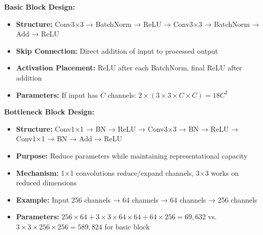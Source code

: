 \documentclass[12pt]{article}
\newcommand{\explanation}[1]{{\color{explanationcolor}#1}}
\begin{document}
\begin{enumerate}[(a)]
\begin{center}
    \end{center}
    
    \explanation{
    \textbf{Basic Block Design:}
    \begin{itemize}
        \item \textbf{Structure:} Conv3×3 → BatchNorm → ReLU → Conv3×3 → BatchNorm → Add → ReLU
        \item \textbf{Skip Connection:} Direct addition of input to processed output
        \item \textbf{Activation Placement:} ReLU after each BatchNorm, final ReLU after addition
        \item \textbf{Parameters:} If input has $C$ channels: $2 \times (3 \times 3 \times C \times C) = 18C^2$
    \end{itemize}
    
    \textbf{Bottleneck Block Design:}
    \begin{itemize}
        \item \textbf{Structure:} Conv1×1 → BN → ReLU → Conv3×3 → BN → ReLU → Conv1×1 → BN → Add → ReLU
        \item \textbf{Purpose:} Reduce parameters while maintaining representational capacity
        \item \textbf{Mechanism:} 1×1 convolutions reduce/expand channels, 3×3 works on reduced dimensions
        \item \textbf{Example:} Input 256 channels → 64 channels → 64 channels → 256 channels
        \item \textbf{Parameters:} $256 \times 64 + 3 \times 3 \times 64 \times 64 + 64 \times 256 = 69,632$ vs. $3 \times 3 \times 256 \times 256 = 589,824$ for basic block
    \end{itemize}
    
}
\end{enumerate}
\end{document}
